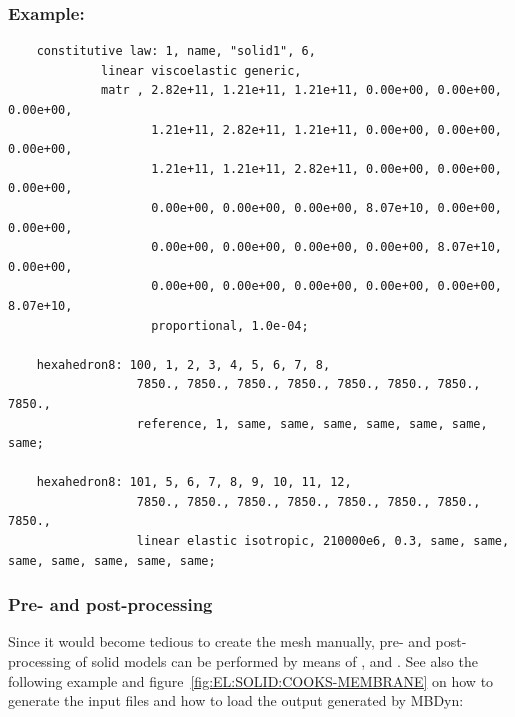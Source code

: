 \subsubsection{Example:}
\begin{verbatim}
    constitutive law: 1, name, "solid1", 6,
             linear viscoelastic generic,
             matr , 2.82e+11, 1.21e+11, 1.21e+11, 0.00e+00, 0.00e+00, 0.00e+00,
                    1.21e+11, 2.82e+11, 1.21e+11, 0.00e+00, 0.00e+00, 0.00e+00,
                    1.21e+11, 1.21e+11, 2.82e+11, 0.00e+00, 0.00e+00, 0.00e+00,
                    0.00e+00, 0.00e+00, 0.00e+00, 8.07e+10, 0.00e+00, 0.00e+00,
                    0.00e+00, 0.00e+00, 0.00e+00, 0.00e+00, 8.07e+10, 0.00e+00,
                    0.00e+00, 0.00e+00, 0.00e+00, 0.00e+00, 0.00e+00, 8.07e+10,
                    proportional, 1.0e-04;

    hexahedron8: 100, 1, 2, 3, 4, 5, 6, 7, 8,
                  7850., 7850., 7850., 7850., 7850., 7850., 7850., 7850.,
                  reference, 1, same, same, same, same, same, same, same;

    hexahedron8: 101, 5, 6, 7, 8, 9, 10, 11, 12,
                  7850., 7850., 7850., 7850., 7850., 7850., 7850., 7850.,
                  linear elastic isotropic, 210000e6, 0.3, same, same, same, same, same, same, same;
\end{verbatim}

\subsubsection{Pre- and post-processing}
\label{sec:EL:SOLID:preprocessing}
Since it would become tedious to create the mesh manually, pre- and post-processing of solid models
can be performed by means of ,
and .
See also the following example and figure~\ref{fig:EL:SOLID:COOKS-MEMBRANE} on how to generate the input files and how to load the output generated by MBDyn:

